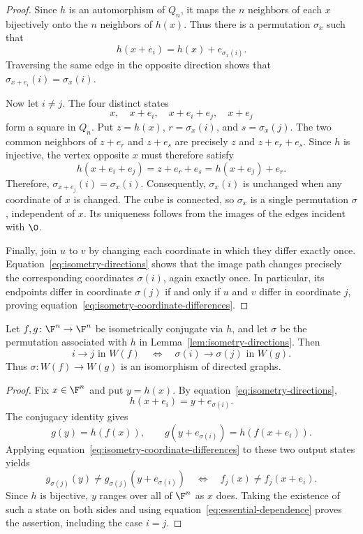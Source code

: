 \begin{proof}
    Since $h$ is an automorphism of $Q_n$, it maps the $n$ neighbors of each $x$ bijectively onto the $n$ neighbors of $h(x)$. Thus there is a permutation $\sigma_x$ such that
    \[
        h(x+ e_i)=h(x)+ e_{\sigma_x(i)}.
    \]
    Traversing the same edge in the opposite direction shows that
    $\sigma_{x+ e_i}(i)=\sigma_x(i)$.

    Now let $i\ne j$. The four distinct states
    \[
        x,\quad x+ e_i,\quad x+ e_i+ e_j,
        \quad x+ e_j
    \]
    form a square in $Q_n$. Put $z=h(x)$, $r=\sigma_x(i)$, and $s=\sigma_x(j)$. The two common neighbors of $z+ e_r$ and $z+ e_s$ are precisely $z$ and $z+ e_r+ e_s$. Since $h$ is injective, the vertex opposite $x$ must therefore satisfy
    \[
        h(x+ e_i+ e_j)=z+ e_r+ e_s= h(x+ e_j)+e_r.
    \]
    Therefore, $\sigma_{x+ e_j}(i)=\sigma_x(i)$. Consequently, $\sigma_x(i)$ is unchanged when any coordinate of $x$ is changed. The cube is connected, so $\sigma_x$ is a single permutation $\sigma$, independent of $x$. Its uniqueness follows from the images of the edges incident with $\0$.

    Finally, join $u$ to $v$ by changing each coordinate in which they differ exactly once. Equation~\eqref{eq:isometry-directions} shows that the image path changes precisely the corresponding coordinates $\sigma(i)$, again exactly once. In particular, its endpoints differ in coordinate $\sigma(j)$ if and only if $u$ and $v$ differ in coordinate $j$, proving equation~\eqref{eq:isometry-coordinate-differences}.
\end{proof}

\begin{proposition}\label{prop:isometric-wiring}
    Let $f,g\colon\F^n\to\F^n$ be isometrically conjugate via $h$, and let $\sigma$ be the permutation associated with $h$ in Lemma~\ref{lem:isometry-directions}. Then
    \[
        i\longrightarrow j\text{ in }W(f)
        \quad\Longleftrightarrow\quad
        \sigma(i)\longrightarrow\sigma(j)\text{ in }W(g).
    \]
    Thus $\sigma\colon W(f)\to W(g)$ is an isomorphism of directed graphs.
\end{proposition}

\begin{proof}
    Fix $x\in\F^n$ and put $y=h(x)$. By equation~\eqref{eq:isometry-directions},
    \[
        h(x+ e_i)=y+ e_{\sigma(i)}.
    \]
    The conjugacy identity gives
    \[
        g(y)=h(f(x)),
        \qquad
        g(y+ e_{\sigma(i)})=h(f(x+ e_i)).
    \]
    Applying equation~\eqref{eq:isometry-coordinate-differences} to these two output states yields
    \[
        g_{\sigma(j)}(y)\ne g_{\sigma(j)}(y+ e_{\sigma(i)})
        \quad\Longleftrightarrow\quad
        f_j(x)\ne f_j(x+ e_i).
    \]
    Since $h$ is bijective, $y$ ranges over all of $\F^n$ as $x$ does. Taking the existence of such a state on both sides and using equation~\eqref{eq:essential-dependence} proves the assertion, including the case $i=j$.
\end{proof}

